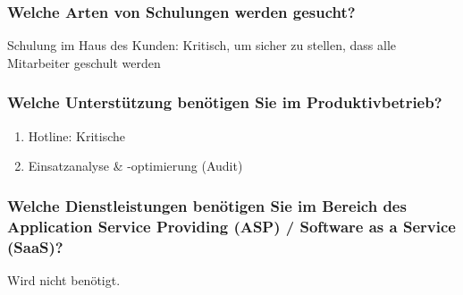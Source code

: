 \subsubsection{Welche Arten von Schulungen werden gesucht?}
Schulung im Haus des Kunden: Kritisch, um sicher zu stellen, dass alle Mitarbeiter geschult werden

\subsubsection{Welche Unterstützung benötigen Sie im Produktivbetrieb?}
\begin{enumerate}
	\item Hotline: Kritische
	\item Einsatzanalyse \& -optimierung (Audit)
\end{enumerate}

\subsubsection{Welche Dienstleistungen benötigen Sie im Bereich des Application Service Providing (ASP) / Software as a Service (SaaS)?}
Wird nicht benötigt.
